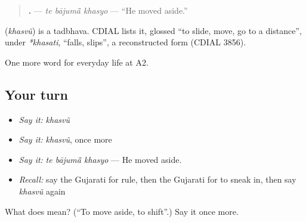 \begin{quote}
\textbf{  .} — \emph{te bājumā̃ khasyo} — \textquotedblleft{}He moved aside.\textquotedblright{}
\end{quote}

\begin{cousinweb}
\textbf{} (\emph{khasvũ}) is a tadbhava. CDIAL lists it, glossed \textquotedblleft{}to slide, move, go to a distance\textquotedblright{}, under \emph{*khasati}, \textquotedblleft{}falls, slips\textquotedblright{}, a reconstructed form (CDIAL 3856).
\end{cousinweb}

\begin{grammarlens}[title={What you've built}]
One more word for everyday life at A2.
\end{grammarlens}

\subsection*{Your turn}
\begin{itemize}
\raggedright
  \item \emph{Say it:} \emph{khasvũ}
  \item \emph{Say it:} \emph{khasvũ}, once more
  \item \emph{Say it:} \emph{te bājumā̃ khasyo} — He moved aside.
  \item \emph{Recall:} say the Gujarati for rule, then the Gujarati for to sneak in, then say \emph{khasvũ} again
\end{itemize}

\begin{tcolorbox}[breakable,colback=teal!4,colframe=teal!35!black,title={Before you move on}]
What does  mean? (\textquotedblleft{}To move aside, to shift\textquotedblright{}.) Say it once more.
\end{tcolorbox}
